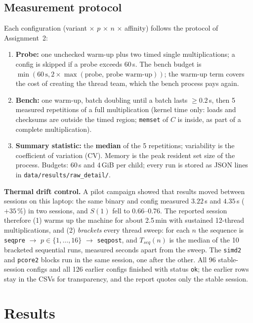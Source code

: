 \documentclass[11pt,a4paper]{article}
\begin{document}
\subsection{Measurement protocol}

Each configuration (variant $\times$ $p$ $\times$ $n$ $\times$ affinity)
follows the protocol of Assignment~2:
\begin{enumerate}
  \item \textbf{Probe:} one unchecked warm-up plus two timed single
        multiplications; a config is skipped if a probe exceeds 60\,s.
        The bench budget is $\min(60\,\text{s}, 2\times
        \max(\text{probe, probe warm-up}))$; the warm-up term covers the
        cost of creating the thread team, which the bench process pays
        again.
  \item \textbf{Bench:} one warm-up, batch doubling until a batch lasts
        $\ge 0.2$\,s, then 5 measured repetitions of a full multiplication
        (kernel time only: loads and checksums are outside the timed
        region; \texttt{memset} of $C$ is inside, as part of a complete
        multiplication).
  \item \textbf{Summary statistic:} the \textbf{median} of the 5
        repetitions; variability is the coefficient of variation (CV).
        Memory is the peak resident set size of the process. Budgets: 60\,s
        and 4\,GiB per child; every run is stored as JSON lines in
        \texttt{data/results/raw\_detail/}.
\end{enumerate}

\textbf{Thermal drift control.}
A pilot campaign showed that results moved between sessions on this
laptop: the same binary and config measured $3.22$\,s and $4.35$\,s
($+35$\,\%) in two sessions, and $S(1)$ fell to 0.66--0.76. The reported
session therefore (1) warms up the machine for about 2.5\,min with
sustained 12-thread multiplications, and (2) \emph{brackets} every thread
sweep: for each $n$ the sequence is \texttt{seqpre} $\rightarrow$ $p \in
\{1,\dots,16\}$ $\rightarrow$ \texttt{seqpost}, and $T_{seq}(n)$ is the
median of the 10 bracketed sequential runs, measured seconds apart from
the sweep. The \texttt{simd2} and \texttt{pcore2} blocks run in the same
session, one after the other. All 96 stable-session configs and all 126
earlier configs finished with status \texttt{ok}; the earlier rows stay in
the CSVs for transparency, and the report quotes only the stable session.

\section{Results}
\end{document}
